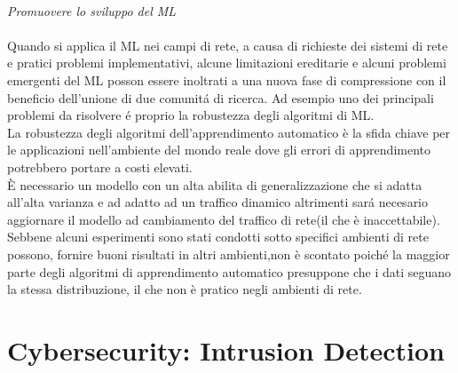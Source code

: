 \documentclass[../tesi.tex]{subfiles}
\begin{document}
\\
\textit{Promuovere lo sviluppo del ML}\\
\\Quando si applica il ML nei campi di rete, a causa di richieste dei sistemi di rete e pratici problemi implementativi, alcune limitazioni ereditarie e alcuni problemi emergenti del ML posson essere inoltrati a una nuova fase di compressione con il beneficio dell’unione di due comunitá di ricerca.
Ad esempio uno dei principali problemi da risolvere é proprio la robustezza degli algoritmi di ML.\\ 
La robustezza degli algoritmi dell’apprendimento automatico è la sfida chiave per le applicazioni nell’ambiente del mondo reale dove gli errori di apprendimento potrebbero portare a costi elevati.\\
È necessario un modello con un alta abilita di generalizzazione che si adatta all’alta varianza e ad adatto ad un traffico dinamico altrimenti sará necesario aggiornare il modello ad cambiamento del traffico di rete(il che è inaccettabile).\\
Sebbene alcuni esperimenti sono stati condotti sotto specifici ambienti di rete possono, fornire buoni risultati in altri ambienti,non è scontato poiché la maggior parte degli algoritmi di apprendimento automatico presuppone che i dati seguano la stessa distribuzione, il che non è pratico negli ambienti di rete.

\newpage
\section{Cybersecurity: Intrusion Detection}
\end{document}
